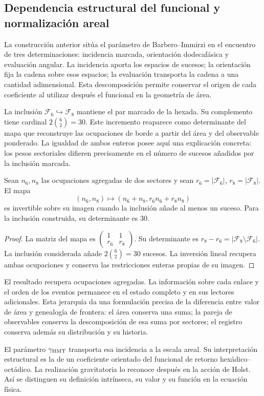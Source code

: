 \subsection{Dependencia estructural del funcional y normalización areal}

La construcción anterior sitúa el parámetro de Barbero--Immirzi en el
encuentro de tres determinaciones: incidencia marcada, orientación
dodecafásica y evaluación angular. La incidencia aporta los espacios
de sucesos; la orientación fija la cadena sobre esos espacios; la
evaluación transporta la cadena a una cantidad adimensional. Esta
descomposición permite conservar el origen de cada coeficiente al
utilizar después el funcional en la geometría de área.

La inclusión \(\mathcal F_6\hookrightarrow\mathcal F_8\) mantiene
el par marcado de la hexada. Su complemento tiene cardinal
\(2\binom62=30\). Este incremento reaparece como determinante del
mapa que reconstruye las ocupaciones de borde a partir del área y
del observable ponderado. La igualdad de ambos enteros posee aquí
una explicación concreta: los pesos sectoriales difieren precisamente
en el número de sucesos añadidos por la inclusión marcada.

\begin{proposition}
Sean \(n_6,n_8\) las ocupaciones agregadas de dos sectores y sean
\(r_6=|\mathcal F_6|\), \(r_8=|\mathcal F_8|\). El mapa
\[
 (n_6,n_8)\longmapsto(n_6+n_8,r_6n_6+r_8n_8)
\]
es invertible sobre su imagen cuando la inclusión añade al menos un
suceso. Para la inclusión construida, su determinante es 30.
\end{proposition}
\begin{proof}
La matriz del mapa es
\(\left(\begin{smallmatrix}1&1\\r_6&r_8\end{smallmatrix}\right)\).
Su determinante es \(r_8-r_6=|\mathcal F_8\setminus\mathcal F_6|\).
La inclusión considerada añade \(2\binom62=30\) sucesos. La inversión
lineal recupera ambas ocupaciones y conserva las restricciones enteras
propias de su imagen.
\end{proof}

El resultado recupera ocupaciones agregadas. La información sobre
cada enlace y el orden de los eventos permanece en el estado completo
y en sus lectores adicionales. Esta jerarquía da una formulación
precisa de la diferencia entre valor de área y genealogía de frontera:
el área conserva una suma; la pareja de observables conserva la
descomposición de esa suma por sectores; el registro conserva además
su distribución y su historia.

El parámetro \(\gamma_{\mathrm{HMT}}\) transporta esa incidencia a la escala
areal. Su interpretación estructural es la de un coeficiente orientado
del funcional de retorno hexádico--octádico. La realización gravitatoria
lo reconoce después en la acción de Holst. Así se distinguen su
definición intrínseca, su valor y su función en la ecuación física.
